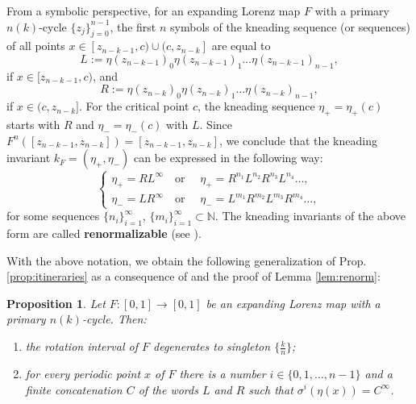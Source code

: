 \documentclass[10pt,reqno]{amsart}
\theoremstyle{plain}
\theoremstyle{assumption}
\theoremstyle{notation}
\theoremstyle{claim}
\theoremstyle{conj}
\theoremstyle{theorem}
\theoremstyle{proposition}
\newtheorem{proposition}{Proposition}[section]
\theoremstyle{corollary}
\begin{document}
From a symbolic perspective, for an expanding Lorenz map $F$ with a primary $n(k)$-cycle $\{z_j \}_{j=0}^{n-1}$, the first $n$ symbols of the kneading sequence (or sequences) of all points $x\in[z_{n-k-1},c)\cup(c,z_{n-k}]$ are equal to 
$$
L:=\eta(z_{n-k-1})_0\eta(z_{n-k-1})_1\ldots\eta(z_{n-k-1})_{n-1},
$$
if $x\in[z_{n-k-1},c)$, and
$$
R:=\eta(z_{n-k})_0\eta(z_{n-k})_1\ldots\eta(z_{n-k})_{n-1},
$$
if $x\in(c,z_{n-k}]$. For the critical point $c$, the kneading sequence $\eta_+=\eta_+(c)$ starts with $R$ and $\eta_-=\eta_-(c)$ with $L$. Since $F^n([z_{n-k-1},z_{n-k}])=[z_{n-k-1},z_{n-k}]$, we conclude that the kneading invariant $k_F=(\eta_+,\eta_-)$ can be expressed in the following way:
\begin{equation*}
			\begin{cases}
				\eta_+=RL^\infty\ \ \
				\text{ or }\ & 
				\eta_+=R^{n_1}L^{n_2}R^{n_3}L^{n_4}\ldots,\\
				\eta_-=LR^\infty\ \ \
				\text{ or }\ &
				\eta_-=L^{m_1}R^{m_2}L^{m_3}R^{m_4}\ldots,
			\end{cases}
\end{equation*}
for some sequences $\{n_i\}_{i=1}^\infty$, $\{m_i\}_{i=1}^\infty\subset\mathbb{N}$. The kneading invariants of the above form are called \textbf{renormalizable} (see \cite{Glen,GS}).

With the above notation, we obtain the following generalization of Prop.\ref{prop:itineraries} as a consequence of \cite[Theorem~5.1]{ChO} and the proof of Lemma \ref{lem:renorm}:

\begin{proposition}\label{prop:itineraries_general}
    Let $F\colon[0,1]\to[0,1]$ be an expanding Lorenz map with a primary $n(k)$-cycle. Then:
            \begin{enumerate}
                \item the rotation interval of $F$ degenerates to singleton $\{\frac{k}{n}\}$;
                \item for every periodic point $x$ of $F$ there is a number $i\in\{0,1,\dots,n-1\}$ and a finite concatenation $C$ of the words $L$ and $R$ such that $\sigma^i(\eta(x))=C^\infty$.
            \end{enumerate}
        \end{proposition}
\end{document}
